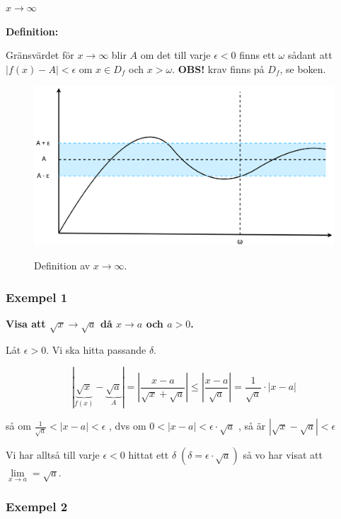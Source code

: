 \documentclass[swedish]{article}
\begin{document}
{\large\underline{$x \to \infty$}}

\smallbreak

\textbf{Definition:}

Gränsvärdet för $x \to \infty$ blir $A$ om det till varje $\epsilon < 0$ finns ett $\omega$ sådant att $|f(x) - A| < \epsilon$ om $x \in D_f$ och $x > \omega$. \textbf{OBS!} krav finns på $D_f$, se boken. 

\begin{figure}[h!]
    \includegraphics[width=14cm]{./figurer/figur3.png}
    \label{fig:figur3}
    \caption{Definition av $x \to \infty$.}
\end{figure}

\subsubsection{Exempel 1}

\textbf{Visa att $\sqrt{x} \to \sqrt{a}$ då $x \to a$ och $a > 0$.}

Låt $\epsilon > 0$. Vi ska hitta passande $\delta$.

\[|\underbrace{\sqrt{x}}_{f(x)} - \underbrace{\sqrt{a}}_A| = \left|\frac{x-a}{\sqrt{x}+\sqrt{a}}\right| \leq \left|\frac{x-a}{\sqrt{a}}\right| = \frac{1}{\sqrt{a}} \cdot \left| x - a \right|\]

\bigbreak

så om $\frac{1}{\sqrt{a}} < |x-a| < \epsilon$ , dvs om $0 < |x-a| < \epsilon \cdot \sqrt{a}$ , så är $|\sqrt{x} - \sqrt{a} | < \epsilon$

\bigbreak

Vi har alltså till varje $\epsilon < 0$ hittat ett $\delta \; (\delta = \epsilon \cdot \sqrt{a})$ så vo har visat att $\lim\limits_{x \to a} = \sqrt{a}$.

\subsubsection{Exempel 2}
\end{document}
